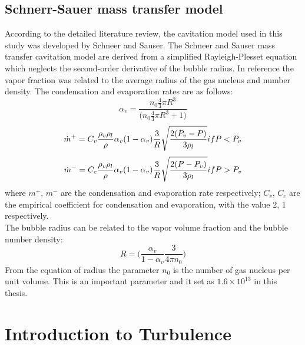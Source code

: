 \subsection{Schnerr-Sauer mass transfer model}
According to the detailed literature review, the cavitation model used in this study was developed by Schneer and Sauser. The Schneer and Sauser mass transfer cavitation model are derived from a simplified 
Rayleigh-Plesset equation which neglects the second-order derivative of the bubble radius. In reference\cite{Zhao2021, Hidalgo2014} the vapor fraction was related to the average radius of the gas nucleus and number density.
The condensation and evaporation rates are as follows:
\begin{equation}
{{\alpha}_v}=\frac{{{n}_0}{\frac{4}{3}}\pi{{R}^3}}{\Bigg({n_0}{\frac{4}{3}}\pi{R^3}+1 \Bigg)}
\end{equation}
\begin{equation}
{{\dot m}^+}={C_v}{\frac{{{\rho}_v}{\rho}_l}{\rho}}{{\alpha}_v}{(1-{\alpha}_v)}{\frac{3}{R}}{\sqrt{\frac{2({P_v}-{P})}{3{\rho}_l}}} \\     {if P<P_v} 
\end{equation}
 \begin{equation}
 {{\dot{m}}^-}={C_c}{\frac{{{\rho}_v}{\rho}_l}{\rho}}{{\alpha}_v}{(1-{\alpha}_v)}{\frac{3}{R}}{\sqrt{\frac{2({P}-{P_v})}{3{\rho}_l}}} \\ {if P>P_v}
 \end{equation}
 where ${m}^+$, ${m}^-$ are the condensation and evaporation rate respectively; $C_v$, $C_c$ are the empirical coefficient for condensation and evaporation, with the value 2, 1 respectively.\\
 The bubble radius can be related to the vapor volume fraction and the bubble number density:
 \begin{equation}
 R=\Bigg({\frac{{{\alpha}_v}}{1-{{\alpha}_v}}}{\frac{3}{4{\pi}{n_0}}}\Bigg)
 \end{equation}
  From the equation of radius the parameter $n_0$ is the number of gas nucleus per unit volume. This is an important parameter and it set as $1.6 \times 10^{13}$ in this thesis.
  
\section{Introduction to Turbulence}
  
  
  
  
  
  
  
